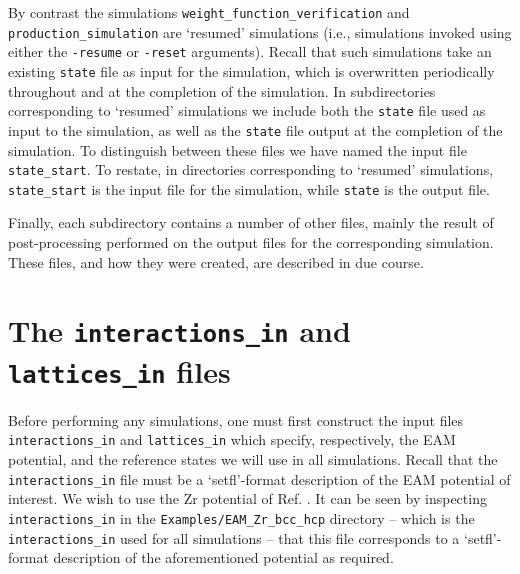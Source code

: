 \documentclass{report}
\begin{document}
By contrast the simulations \texttt{weight\_function\_verification} and \texttt{production\_simulation} are `resumed' simulations (i.e., simulations 
invoked using either the \texttt{-resume} or \texttt{-reset} arguments). Recall that such simulations take an existing \texttt{state} file as input for 
the simulation, which is overwritten periodically throughout and at the completion of the simulation. In subdirectories corresponding to `resumed'
simulations we include both the \texttt{state} file used as input to the simulation, as well as the \texttt{state} file output at the completion of
the simulation. To distinguish between these files we have named the input file \texttt{state\_start}. To restate, in directories 
corresponding to `resumed' simulations, \texttt{state\_start} is the input file for the simulation, while \texttt{state} is the output file.

Finally, each subdirectory contains a number of other files, mainly the result of post-processing performed on the output files for the 
corresponding simulation. These files, and how they were created, are described in due course.


\section{The \texttt{interactions\_in} and \texttt{lattices\_in} files}
Before performing any simulations, one must first construct the input files \texttt{interactions\_in} and \texttt{lattices\_in}
which specify, respectively, the EAM potential, and the reference states we will use in all simulations. Recall that the 
\texttt{interactions\_in} file must be a `setfl'-format description of the EAM potential of interest.
We wish to use the Zr potential of Ref. \cite{Mendelev_2007}. It can be seen by inspecting \texttt{interactions\_in} in the 
\texttt{Examples/EAM\_Zr\_bcc\_hcp} directory -- which is the \texttt{interactions\_in} used for all simulations --  that this
file corresponds to a `setfl'-format description of the aforementioned potential as required.
\end{document}

